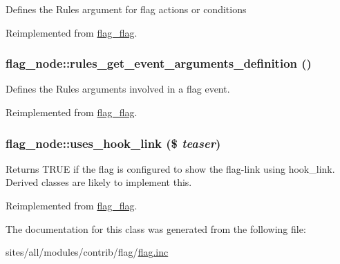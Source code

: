 Defines the Rules argument for flag actions or conditions 

Reimplemented from \hyperlink{group__rules_g88951558f573d816de08b9e9d49ff4c2}{flag\_\-flag}.\hypertarget{classflag__node_eecfa8b26fc30aaafc376e92f6a2c00b}{
\subsubsection[{rules\_\-get\_\-event\_\-arguments\_\-definition}]{\setlength{\rightskip}{0pt plus 5cm}flag\_\-node::rules\_\-get\_\-event\_\-arguments\_\-definition ()}}
\label{classflag__node_eecfa8b26fc30aaafc376e92f6a2c00b}


Defines the Rules arguments involved in a flag event. 

Reimplemented from \hyperlink{group__rules_g21a07dbe1a9e496438d235e95e67c048}{flag\_\-flag}.\hypertarget{classflag__node_60653b0f36b6161d0e2ae012ff94319f}{
\subsubsection[{uses\_\-hook\_\-link}]{\setlength{\rightskip}{0pt plus 5cm}flag\_\-node::uses\_\-hook\_\-link (\$ {\em teaser})}}
\label{classflag__node_60653b0f36b6161d0e2ae012ff94319f}


Returns TRUE if the flag is configured to show the flag-link using hook\_\-link. Derived classes are likely to implement this. 

Reimplemented from \hyperlink{classflag__flag_10e87c5a12cc7b857d388985295bc8ab}{flag\_\-flag}.

The documentation for this class was generated from the following file:\begin{CompactItemize}
\item 
sites/all/modules/contrib/flag/\hyperlink{flag_8inc}{flag.inc}\end{CompactItemize}
